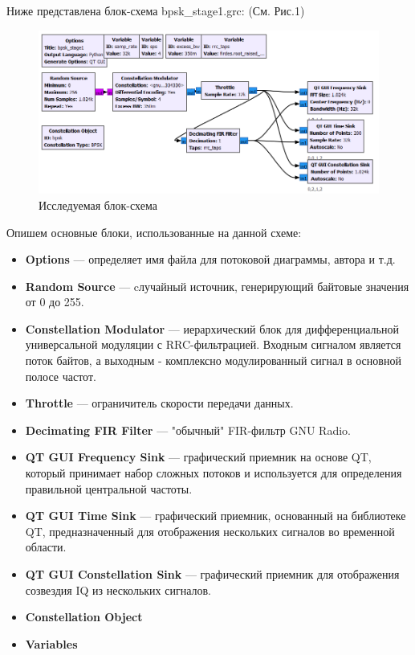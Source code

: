 \documentclass[12pt]{article}
\begin{document}
Ниже представлена блок-схема bpsk\_stage1.grc: (См. Рис.1)

\begin{figure}[h]
    \centering
    \includegraphics[width=1\textwidth]{pics/a0000-img001.png}
    \caption{Исследуемая блок-схема}
\end{figure}

\bigskip

Опишем основные блоки, использованные на данной схеме:

\begin{itemize}
	\item \textbf{Options} --- определяет имя файла для потоковой диаграммы, автора и т.д.
	\item \textbf{Random Source} --- cлучайный источник, генерирующий байтовые значения от 0 до 255.
	\item \textbf{Constellation Modulator} --- иерархический блок для дифференциальной универсальной модуляции с RRC-фильтрацией. Входным сигналом является поток байтов, а выходным - комплексно модулированный сигнал в основной полосе частот.
	\item \textbf{Throttle} --- ограничитель скорости передачи данных.
	\item \textbf{Decimating FIR Filter} --- "обычный" FIR-фильтр GNU Radio.
	\item \textbf{QT GUI Frequency Sink} --- графический приемник на основе QT, который принимает набор сложных потоков и используется для определения правильной центральной частоты.
	\item \textbf{QT GUI Time Sink} --- графический приемник, основанный на библиотеке QT, предназначенный для отображения нескольких сигналов во временной области.
	\item \textbf{QT GUI Constellation Sink} --- графический приемник для отображения созвездия IQ из нескольких сигналов.
	\item \textbf{Constellation Object} 
	\item \textbf{Variables} 
\end{itemize}
\end{document}
